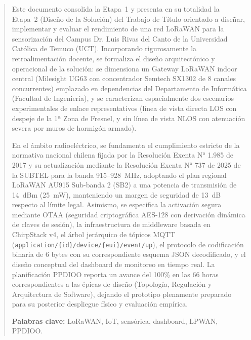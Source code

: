 \documentclass[12pt,oneside,openany,spanish,oldfontcommands]{memoir}
\begin{document}
\tableofcontents*
\clearpage

\listoftables*
\clearpage

\listoffigures*
\clearpage

\thispagestyle{empty}

\begin{abstract}

Este documento consolida la Etapa~1 y presenta en su totalidad la Etapa~2 (Diseño de la Solución) del Trabajo de Título orientado a diseñar, implementar y evaluar el rendimiento de una red LoRaWAN para la sensorización del Campus Dr. Luis Rivas del Canto de la Universidad Católica de Temuco (UCT). Incorporando rigurosamente la retroalimentación docente, se formaliza el diseño arquitectónico y operacional de la solución: se dimensiona un Gateway LoRaWAN indoor central (Milesight UG63 con concentrador Semtech SX1302 de 8 canales concurrentes) emplazado en dependencias del Departamento de Informática (Facultad de Ingeniería), y se caracterizan espacialmente dos escenarios experimentales de enlace representativos (línea de vista directa LOS con despeje de la 1ª Zona de Fresnel, y sin línea de vista NLOS con atenuación severa por muros de hormigón armado).

En el ámbito radioeléctrico, se fundamenta el cumplimiento estricto de la normativa nacional chilena fijada por la Resolución Exenta N° 1.985 de 2017 y su actualización mediante la Resolución Exenta N° 737 de 2025 de la SUBTEL para la banda 915--928~MHz, adoptando el plan regional LoRaWAN AU915 Sub-banda 2 (SB2) a una potencia de transmisión de 14~dBm (25~mW), manteniendo un margen de seguridad de 13~dB respecto al límite legal. Asimismo, se especifica la activación segura mediante OTAA (seguridad criptográfica AES-128 con derivación dinámica de claves de sesión), la infraestructura de middleware basada en ChirpStack v4, el árbol jerárquico de tópicos MQTT (\texttt{application/\{id\}/device/\{eui\}/event/up}), el protocolo de codificación binaria de 6 bytes con su correspondiente esquema JSON decodificado, y el diseño conceptual del dashboard de monitoreo en tiempo real. La planificación PPDIOO reporta un avance del 100\% en las 66 horas correspondientes a las épicas de diseño (Topología, Regulación y Arquitectura de Software), dejando el prototipo plenamente preparado para su posterior despliegue físico y evaluación empírica.

\textbf{Palabras clave:} LoRaWAN, IoT, sensórica, dashboard, LPWAN, PPDIOO.
\end{abstract}
\end{document}

